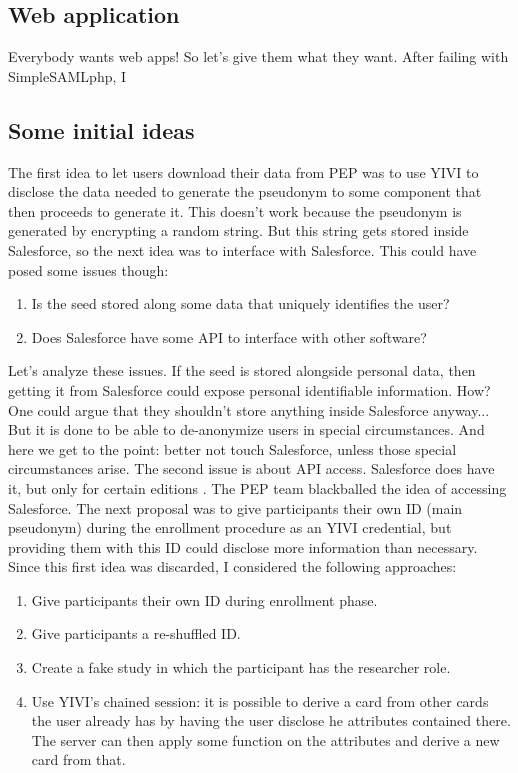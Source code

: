 \documentclass{report}
\begin{document}
\subsection{Web application}
Everybody wants web apps! So let's give them what they want. After failing with SimpleSAMLphp, I 

\iffalse
\subsection{Some initial ideas}
The first idea to let users download their data from PEP was to use YIVI to disclose the data needed to generate the pseudonym to some component that then proceeds to generate it.
This doesn't work because the pseudonym is generated by encrypting a random string. But this string gets stored inside Salesforce, so the next idea was to interface with
Salesforce. This could have posed some issues though:
\begin{enumerate}
		\item Is the seed stored along some data that uniquely identifies the user?
		\item Does Salesforce have some API to interface with other software?
\end{enumerate}
Let's analyze these issues. If the seed is stored alongside personal data, then getting it from Salesforce could expose personal identifiable information. How? One could argue that
they shouldn't store anything inside Salesforce anyway... But it is done to be able to de-anonymize users in special circumstances. And here we get to the point: better not touch
Salesforce, unless those special circumstances arise. The second issue is about API access. Salesforce does have it, but only for certain editions \cite{salesforce}. The PEP team
blackballed the idea of accessing Salesforce. The next proposal was to give participants their own ID (main pseudonym) during the enrollment procedure as an YIVI credential, but
providing them with this ID could disclose more information than necessary.
Since this first idea was discarded, I considered the following approaches:
\begin{enumerate}
		\item Give participants their own ID during enrollment phase.
		\item Give participants a re-shuffled ID.
		\item Create a fake study in which the participant has the researcher role.
		\item Use YIVI’s chained session: it is possible to derive a card from other cards the user already has by having the user disclose he attributes contained there. The server can then apply some function on the attributes and derive a new card from that.
\end{enumerate}
\end{document}
